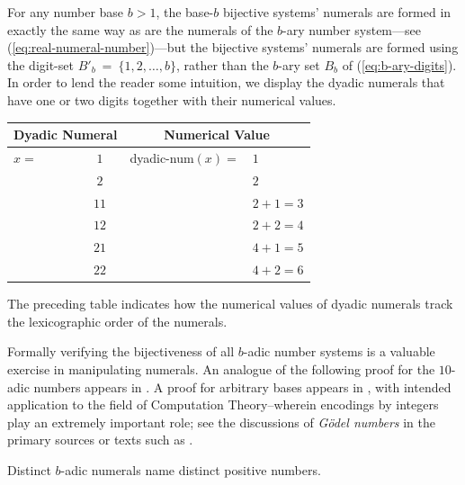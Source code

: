 For any number base $b > 1$, the base-$b$ bijective systems' numerals
are formed in exactly the same way as are the numerals of the $b$-ary
number system---see (\ref{eq:real-numeral-number})---but the bijective
systems' numerals are formed using the digit-set $B'_b \ = \ \{1, 2,
\ldots, b\}$, rather than the $b$-ary set $B_b$ of
(\ref{eq:b-ary-digits}).  In order to lend the reader some intuition,
we display the dyadic numerals that have one or two digits together
with their numerical values.

\smallskip

\begin{tabular}{|lc|ll|}
\hline
\multicolumn{2}{c}{\bf Dyadic Numeral} & \multicolumn{2}{c}{\bf Numerical Value} \\
\hline
$x=$ & $1$  & {\sc dyadic-num}$(x) =$ & $1$ \\
     & $2$  &                         & $2$ \\
     & $11$ &                         & $2 + 1 = 3$ \\
     & $12$ &                         & $2 + 2 = 4$ \\
     & $21$ &                         & $4 + 1 = 5$ \\
     & $22$ &                         & $4 + 2 = 6$ \\
\hline
\end{tabular}

\medskip
\noindent
The preceding table indicates how the numerical values of dyadic
numerals track the lexicographic order of the numerals.

\bigskip

Formally verifying the bijectiveness of all $b$-adic number systems is
a valuable exercise in manipulating numerals.  An analogue of the
following proof for the $10$-adic numbers appears in \cite{Foster47}.
A proof for arbitrary bases appears in \cite{Smullyan61}, with
intended application to the field of Computation Theory--wherein
encodings by integers play an extremely important role; see the
discussions of {\it G\"{o}del numbers}  in
the primary sources \cite{Goedel31,Turing36} or texts such as
\cite{Rosenberg12}.

\begin{prop}
\label{thm:adic-bijective}
Distinct $b$-adic numerals name distinct positive numbers.
\end{prop}


